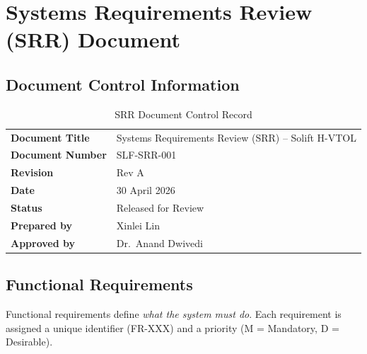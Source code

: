 \chapter{Systems Requirements Review (SRR) Document}

\section{Document Control Information}

\begin{table}[H]
\centering
\small
\caption{SRR Document Control Record}
\begin{tabularx}{\textwidth}{L{4cm} X}
\toprule
\textbf{Document Title}   & Systems Requirements Review (SRR) -- Solift H-VTOL \\
\textbf{Document Number}  & SLF-SRR-001 \\
\textbf{Revision}         & Rev A \\
\textbf{Date}             & 30 April 2026 \\
\textbf{Status}           & Released for Review \\
\textbf{Prepared by}      & Xinlei Lin \\
\textbf{Approved by}      & Dr.\ Anand Dwivedi \\
\bottomrule
\end{tabularx}
\end{table}

\section{Functional Requirements}

Functional requirements define \textit{what the system must do}. Each requirement is assigned a unique identifier (FR-XXX) and a priority (M = Mandatory, D = Desirable).

